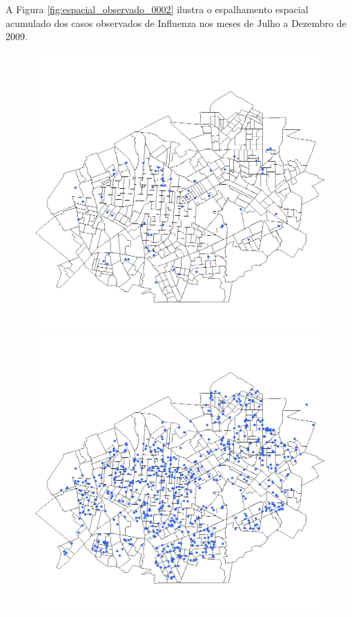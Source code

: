 A Figura \ref{fig:espacial_observado_0002} ilustra o espalhamento espacial acumulado dos casos observados de Influenza nos meses de Julho a Dezembro de 2009.

\begin{figure}[H]
  \centering
  \begin{minipage}{.45\textwidth}
    \centering
    \includegraphics[width=1.0\textwidth]{Figuras/Resultados/Observado/01-07-2009.png}
    \captionsetup{labelformat=empty}
  \end{minipage}%
  \begin{minipage}{.45\textwidth}
    \centering
    \includegraphics[width=1.0\textwidth]{Figuras/Resultados/Observado/01-08-2009.png}

\end{minipage}
\end{figure}
